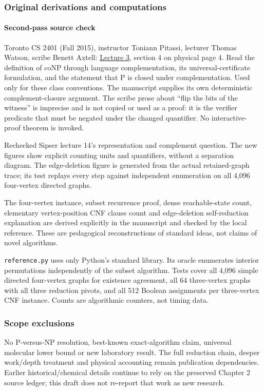 \subsubsection{Original derivations and
computations}\label{original-derivations-and-computations}

\paragraph{Second-pass source check}\label{second-pass-source-check}

Toronto CS 2401 (Fall 2015), instructor Toniann Pitassi, lecturer Thomas
Watson, scribe Benett Axtell:
\href{https://www.cs.toronto.edu/~toni/Courses/Complexity2015/lectures/lecture3.pdf}{Lecture
3}, section 4 on physical page 4. Read the definition of coNP through
language complementation, its universal-certificate formulation, and the
statement that P is closed under complementation. Used only for these
class conventions. The manuscript supplies its own deterministic
complement-closure argument. The scribe prose about ``flip the bits of
the witness'' is imprecise and is not copied or used as a proof: it is
the verifier predicate that must be negated under the changed
quantifier. No interactive-proof theorem is invoked.

Rechecked Sipser lecture 14's representation and complement question.
The new figures show explicit counting units and quantifiers, without a
separation diagram. The edge-deletion figure is generated from the
actual retained-graph trace; its test replays every step against
independent enumeration on all 4,096 four-vertex directed graphs.

The four-vertex instance, subset recurrence proof, dense reachable-state
count, elementary vertex-position CNF clause count and edge-deletion
self-reduction explanation are derived explicitly in the manuscript and
checked by the local reference. These are pedagogical reconstructions of
standard ideas, not claims of novel algorithms.

\texttt{reference.py} uses only Python's standard library. Its oracle
enumerates interior permutations independently of the subset algorithm.
Tests cover all 4,096 simple directed four-vertex graphs for existence
agreement, all 64 three-vertex graphs with all three reduction pivots,
and all 512 Boolean assignments per three-vertex CNF instance. Counts
are algorithmic counters, not timing data.

\subsubsection{Scope exclusions}\label{scope-exclusions}

No P-versus-NP resolution, best-known exact-algorithm claim, universal
molecular lower bound or new laboratory result. The full reduction
chain, deeper work/depth treatment and physical accounting remain
publication dependencies. Earlier historical/chemical details continue
to rely on the preserved Chapter 2 source ledger; this draft does not
re-report that work as new research.
